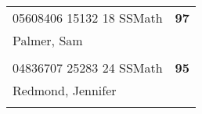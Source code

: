 \documentclass[a4paper,12pt]{article}
\begin{document}
\begin{tabular}{
   |p{9mm}|
    p{9mm}|
    p{9mm}|
    p{9mm}|
    p{9mm}|
    p{9mm}|
    p{9mm}|
    p{9mm}|
    p{9mm}|
    p{9mm}|}
      &    &    &    &    &    &    &    &    &     \\
\hline\hline
\multicolumn{9}{|l|}{05608406 15132 18 SSMath} & \textbf{97} \\
\hline
\multicolumn{10}{|l|}{Palmer, Sam} \\
\hline
   \vrule height8mm width0pt depth2mm 
      &    &    &    &    &    &    &    &    &     \\
\hline\hline
\multicolumn{9}{|l|}{04836707 25283 24 SSMath} & \textbf{95} \\
\hline
\multicolumn{10}{|l|}{Redmond, Jennifer} \\
\hline
   \vrule height8mm width0pt depth2mm 
      &    &    &    &    &    &    &    &    &     \\
\hline\hline
\end{tabular}
\newpage
\end{document}
